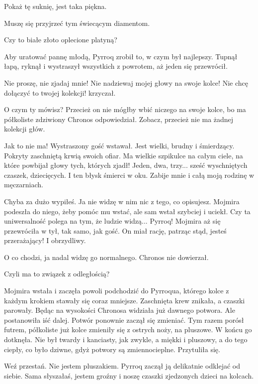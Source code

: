 \ds{} Pokaż tę suknię, jest taka piękna. \de{}

\ds{} Muszę się przyjrzeć tym świecącym diamentom. \de{}

\ds{} Czy to białe złoto oplecione platyną? \de{}

Aby uratować pannę młodą, Pyrroq zrobił to, w czym był najlepszy. Tupnął łapą, ryknął i wystraszył wszystkich z powrotem, aż jeden się przewrócił.

\ds{} Nie proszę, nie zjadaj mnie! Nie nadziewaj mojej głowy na swoje kolce! Nie chcę dołączyć to twojej kolekcji! \dm{} krzyczał. \de{}

\ds{} O czym ty mówisz? Przecież on nie mógłby wbić niczego na swoje kolce, bo ma półkoliste \dm{} zdziwiony Chronos odpowiedział. \dm{}
Zobacz, przecież nie ma żadnej kolekcji głów. \de{}

\ds{} Jak to nie ma! \dm{} Wystraszony gość wstawał. \dm{} Jest wielki, brudny i śmierdzący. Pokryty zaschniętą krwią swoich ofiar.
Ma wielkie szpikulce na całym ciele, na które powbijał głowy tych, których zjadł! Jeden, dwa, trzy... sześć wyschniętych czaszek, dziecięcych.
I ten błysk śmierci w oku. Zabije mnie i całą moją rodzinę w męczarniach. \de{}

\ds{} Chyba za dużo wypiłeś. Ja nie widzę w nim nic z tego, co opisujesz. \dm{} Mojmira podeszła do niego, żeby pomóc mu wstać, ale sam wstał szybciej i uciekł. \dm{}
Czy ta uniwersalność polega na tym, że ludzie widzą... Pyrroq! \dm{} Mojmira aż się przewróciła w tył, tak samo, jak gość. \dm{} On miał rację, patrząc stąd, jesteś przerażający! I obrzydliwy. \de{}

\ds{} O co chodzi, ja nadal widzę go normalnego. \dm{} Chronos nie dowierzał. \de{}

\ds{} Czyli ma to związek z odległością? \dm{}

Mojmira wstała i zaczęła powoli podchodzić do Pyrroqua, którego kolce z każdym krokiem stawały się coraz mniejsze. Zaschnięta krew znikała, a czaszki parowały. 
Będąc na wysokości Chronosa widziała już dawnego potwora.
Ale postanowiła iść dalej. Potwór ponownie zaczął się zmieniać.
Tym razem porósł futrem, półkoliste już kolce zmieniły się z ostrych noży, na pluszowe.
W końcu go dotknęła.
Nie był twardy i kanciasty, jak zwykle, a miękki i pluszowy, a do tego ciepły, co było dziwne, gdyż potwory są zmiennocieplne.
Przytuliła się.

\ds{} Weź przestań. Nie jestem pluszakiem. \dm{} Pyrroq zaczął ją delikatnie odklejać od siebie. \dm{}
Sama słyszałaś, jestem groźny i noszę czaszki zjedzonych dzieci na kolcach. \de{}

